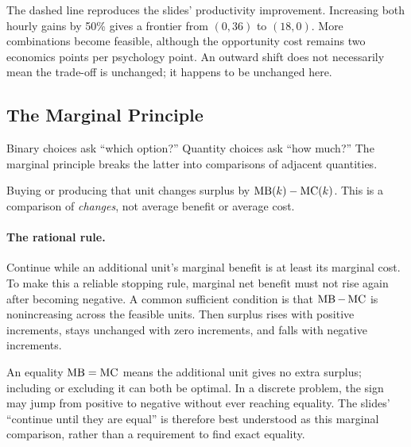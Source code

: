 The dashed line reproduces the slides' productivity improvement. Increasing
both hourly gains by 50\% gives a frontier from $(0,36)$ to $(18,0)$.
More combinations become feasible, although the opportunity cost remains
two economics points per psychology point. An outward shift does not
necessarily mean the trade-off is unchanged; it happens to be unchanged here.

\subsection{The Marginal Principle}
Binary choices ask ``which option?'' Quantity choices ask ``how much?''
The marginal principle breaks the latter into comparisons of adjacent quantities.

Buying or producing that unit changes surplus by $\operatorname{MB}(k)-\operatorname{MC}(k)$.
This is a comparison of \emph{changes}, not average benefit or average cost.

\paragraph{The rational rule.}
Continue while an additional unit's marginal benefit is at least its
marginal cost. To make this a reliable stopping rule, marginal net benefit
must not rise again after becoming negative. A common sufficient condition
is that $\operatorname{MB}-\operatorname{MC}$ is nonincreasing across the feasible units.
Then surplus rises with positive increments, stays unchanged with zero
increments, and falls with negative increments.

An equality $\operatorname{MB}=\operatorname{MC}$ means the additional unit gives no extra surplus;
including or excluding it can both be optimal. In a discrete problem,
the sign may jump from positive to negative without ever reaching equality.
The slides' ``continue until they are equal'' is therefore best understood
as this marginal comparison, rather than a requirement to find exact equality.

